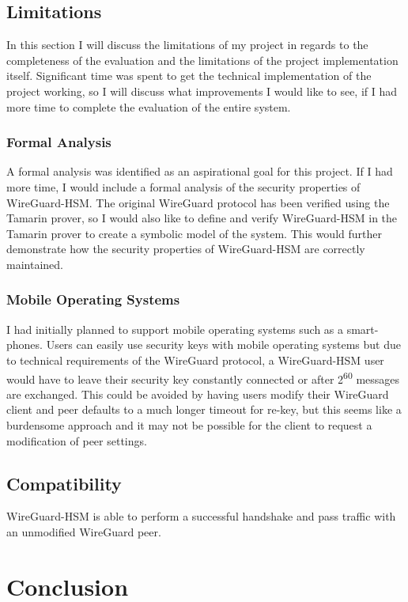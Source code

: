 \documentclass [11pt, proquest] {uwthesis}[2020/02/24]
\begin{document}
\section {Limitations}
In this section I will discuss the limitations of my project in regards to the completeness of the evaluation and the limitations of the project implementation itself. Significant time was spent to get the technical implementation of the project working, so I will discuss what improvements I would like to see, if I had more time to complete the evaluation of the entire system.

\subsection{Formal Analysis}
A formal analysis was identified as an aspirational goal for this project. If I had more time, I would include a formal analysis of the security properties of WireGuard-HSM. The original WireGuard protocol has been verified using the Tamarin prover\cite{donenfeld_formal_2018}, so I would also like to define and verify WireGuard-HSM in the Tamarin prover to create a symbolic model of the system. This would further demonstrate how the security properties of WireGuard-HSM are correctly maintained.

\subsection{Mobile Operating Systems}
I had initially planned to support mobile operating systems such as a smart-phones. Users can easily use security keys
with mobile operating systems but due to technical requirements of the WireGuard protocol, a WireGuard-HSM user would have to leave their security key constantly connected
or after 2\textsuperscript{60} messages are exchanged. This could be avoided by having users modify their WireGuard client and peer defaults to a much longer timeout for re-key, but this seems like a burdensome approach and it may not be possible for the client to request a modification of peer settings.


\section{Compatibility}
WireGuard-HSM is able to perform a successful handshake and pass traffic with an unmodified WireGuard peer.

\chapter {Conclusion}
 
\end{document}
